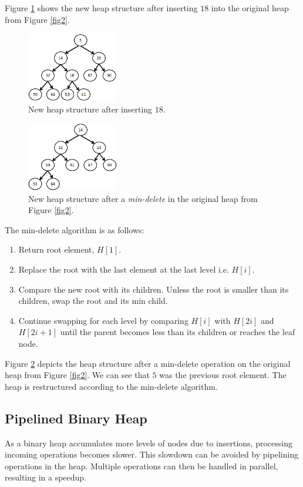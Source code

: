 Figure \ref{normal-insert} shows the new heap structure after inserting $18$ into the original heap from Figure \ref{fig2}.

\begin{figure}[!ht]
  \centering
  \includegraphics[width=4cm]{fig/normal-insert.png}
      \caption{New heap structure after inserting $18$.}
    \label{normal-insert}
\end{figure}

\begin{figure}[!ht]
  \centering
  \includegraphics[width=4cm]{fig/normal-delete.png}
      \caption{New heap structure after a {\it min-delete} in the original heap from Figure \ref{fig2}.}
    \label{normal-delete}
\end{figure}

The min-delete algorithm is as follows:
\begin{enumerate}
\item Return root element, $H[1]$.
\item Replace the root with the last element at the last level i.e. $H[i]$.
\item Compare the new root with its children. Unless the root is smaller than its children, swap the root and its min child.
\item Continue swapping for each level by comparing $H[i]$ with $H[2i]$ and $H[2i+1]$ until the parent becomes less than its children or reaches the leaf node.
\end{enumerate}

Figure \ref{normal-delete} depicts the heap structure after a min-delete operation on the original heap from Figure \ref{fig2}.
We can see that $5$ was the previous root element.
The heap is restructured according to the min-delete algorithm.

\subsection{Pipelined Binary Heap}
As a binary heap accumulates more levels of nodes due to insertions, processing incoming operations becomes slower.
This slowdown can be avoided by pipelining operations in the heap.
Multiple operations can then be handled in parallel, resulting in a speedup.

